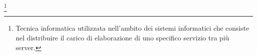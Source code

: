 \footnote{Tecnica informatica utilizzata nell'ambito dei sistemi informatici che consiste nel distribuire il carico di elaborazione di uno specifico
servizio tra più server.}

